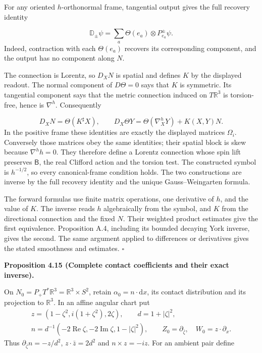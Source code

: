 \documentclass[
  english,
  11pt,
  reqno]{amsart}
\makeatletter
\newcommand{\pandocstatementheading}[1]{%
  \par\addpenalty{\@beginparpenalty}%
  \addvspace{.5\baselineskip plus .2\baselineskip minus .2\baselineskip}%
  {\normalfont\bfseries #1\par}%
  \nobreak\@afterindenttrue\@afterheading
}
\makeatother
\begin{document}
For any oriented \(h\)-orthonormal frame, tangential output gives the
full recovery identity

\label{eq:online-source-uncontracted-exact-recovery} \[
\mathbb D_\pm\psi
=\sum_a\Theta(e_a)\otimes P_{e_a}^\pm\psi.
\] Indeed, contraction with each \(\Theta(e_a)\) recovers its
corresponding component, and the output has no component along \(N\).

The connection is Lorentz, so \(D_XN\) is spatial and defines \(K\) by
the displayed readout. The normal component of \(D\Theta=0\) says that
\(K\) is symmetric. Its tangential component says that the metric
connection induced on \(T\mathbb R^3\) is torsion-free, hence is
\(\nabla^h\). Consequently

\label{eq:online-source-gauss-weingarten} \[
D_XN=\Theta(K^\sharp X),\qquad
D_X\Theta Y=\Theta(\nabla_X^hY)+K(X,Y)N.
\] In the positive frame these identities are exactly the displayed
matrices \(\Omega_i\). Conversely those matrices obey the same
identities; their spatial block is skew because \(\nabla^h h=0\). They
therefore define a Lorentz connection whose spin lift preserves
\(\mathsf B\), the real Clifford action and the torsion test. The
constructed symbol is \(h^{-1/2}\), so every canonical-frame condition
holds. The two constructions are inverse by the full recovery identity
and the unique Gauss--Weingarten formula.

The forward formulas use finite matrix operations, one derivative of
\(h\), and the value of \(K\). The inverse reads \(h\) algebraically
from the symbol, and \(K\) from the directional connection and the fixed
\(N\). Their weighted product estimates give the first equivalence.
Proposition A.4, including its bounded decaying York inverse, gives the
second. The same argument applied to differences or derivatives gives
the stated smoothness and estimates. \hfill\(\square\)

\pandocstatementheading{\leavevmode{}\label{prop:online-contact-complete-kinematic-codec}Proposition 4.15 (Complete contact coefficients and their exact
inverse).}

On \(N_0=P_+T^*\mathbb R^3=\mathbb R^3\times S^2\), retain
\(\alpha_0=n\cdot\mathrm dx\), its contact distribution and its
projection to \(\mathbb R^3\). In an affine angular chart put \[
\begin{gathered}
z=(1-\zeta^2,i(1+\zeta^2),2\zeta),\qquad
d=1+|\zeta|^2,\\
n=d^{-1}(-2\operatorname{Re}\zeta,-2\operatorname{Im}\zeta,1-|\zeta|^2),
\qquad Z_0=\partial_{\bar\zeta},\quad W_0=z\cdot\partial_x.
\end{gathered}
\] Thus \(\partial_{\bar\zeta}n=-z/d^2\), \(z\cdot\bar z=2d^2\) and
\(n\times z=-iz\). For an ambient pair define
\end{document}
